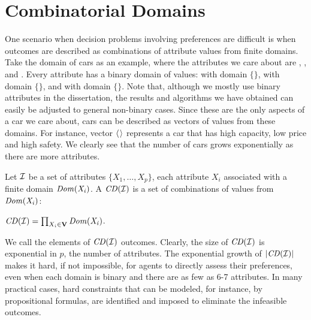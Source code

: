 \section{Combinatorial Domains \label{sec:comb_domains}}
One scenario when decision problems involving preferences are difficult is when outcomes
are described as combinations of attribute values from finite domains.
Take the domain of cars as an example, where the attributes we care about are
, , and .
Every attribute has a binary domain of values:
 with domain $\{$$\}$,
 with domain $\{$$\}$, and
 with domain $\{$$\}$.
Note that, although we mostly use binary attributes in the dissertation,
the results and algorithms we have obtained can easily be adjusted
to general non-binary cases.
Since these are the only aspects of a car we care about, cars can be
described as vectors of values from these domains.
For instance, vector $\mathit{\langle}$$\mathit{\rangle}$ represents
a car that has high capacity, low price and high safety.
We clearly see that the number of cars grows exponentially as
there are more attributes.

\begin{definition}
	Let $\mathcal{I}$ be a set of attributes $\{X_1,\ldots,X_p\}$, each attribute $X_i$
	associated with a finite domain $\it{Dom}(X_i)$.
	A  $\mathit{CD}(\mathcal{I})$ is a set of 
	combinations of values from $\it{Dom}(X_i)$:
	\begin{center}
		$\mathit{CD}(\mathcal{I}) = \prod_{X_i \in \textbf{V}} \it{Dom}(X_i)$.
	\end{center}
\end{definition}


We call the elements of $\mathit{CD}(\mathcal{I})$ outcomes.
Clearly, the size of $\mathit{CD}(\mathcal{I})$ is exponential in $p$, the number of attributes.
The exponential growth of $|\mathit{CD}(\mathcal{I})|$ makes it hard, if not impossible, for agents
to directly assess their preferences, even when each domain is binary and
there are as few as 6-7 attributes.
In many practical cases, hard constraints that can be modeled, for instance, 
by propositional formulas, are identified and imposed 
to eliminate the infeasible outcomes.



